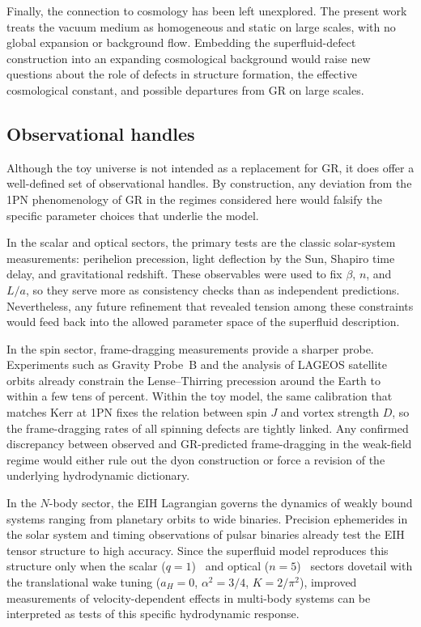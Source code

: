\documentclass[11pt]{article}
\begin{document}
Finally, the connection to cosmology has been left unexplored.
The present work treats the vacuum medium as homogeneous and static
on large scales, with no global expansion or background flow.
Embedding the superfluid-defect construction into an expanding
cosmological background would raise new questions about the role of
defects in structure formation, the effective cosmological constant,
and possible departures from GR on large scales.

\subsection{Observational handles}
\label{subsec:discussion-observables}

Although the toy universe is not intended as a replacement for GR,
it does offer a well-defined set of observational handles.
By construction, any deviation from the 1PN phenomenology of GR in
the regimes considered here would falsify the specific parameter
choices that underlie the model.

In the scalar and optical sectors, the primary tests are the classic
solar-system measurements:
perihelion precession, light deflection by the Sun, Shapiro time
delay, and gravitational redshift.
These observables were used to fix $\beta$, $n$, and $L/a$, so they
serve more as consistency checks than as independent predictions.
Nevertheless, any future refinement that revealed tension among these
constraints would feed back into the allowed parameter space of the
superfluid description.

In the spin sector, frame-dragging measurements provide a sharper
probe.
Experiments such as Gravity Probe~B and the analysis of LAGEOS
satellite orbits already constrain the Lense--Thirring precession
around the Earth to within a few tens of percent.
Within the toy model, the same calibration that matches Kerr at 1PN
fixes the relation between spin $J$ and vortex strength $D$, so the
frame-dragging rates of all spinning defects are tightly linked.
Any confirmed discrepancy between observed and GR-predicted
frame-dragging in the weak-field regime would either rule out the
dyon construction or force a revision of the underlying hydrodynamic
dictionary.

In the $N$-body sector, the EIH Lagrangian governs the dynamics of
weakly bound systems ranging from planetary orbits to wide binaries.
Precision ephemerides in the solar system and timing observations of
pulsar binaries already test the EIH tensor structure to high
accuracy.
Since the superfluid model reproduces this structure only when the
scalar ($q=1$)~\cite{Norris:2025Orbits} and optical ($n=5$)~\cite{Norris:Paper2} sectors dovetail
with the translational wake tuning ($a_H=0$, $\alpha^2=3/4$, $K=2/\pi^2$),
improved measurements of velocity-dependent effects in multi-body systems can
be interpreted as tests of this specific hydrodynamic response.
\end{document}
